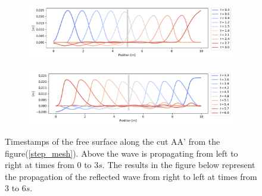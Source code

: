 \documentclass[a4paper,12pt]{article}
\begin{document}
\begin{figure}[h]
\begin{subfigure}{\textwidth}
    \includegraphics[width=\textwidth]{img/step/free_surface_1.pdf}
\end{subfigure}
\begin{subfigure}{\textwidth}
    \includegraphics[width=\textwidth]{img/step/free_surface_2.pdf}
\end{subfigure}
\caption{Timestamps of the free surface along the cut AA' from the figure(\ref{step_mesh}). Above the wave is propagating from left to right at times from $0$ to $3s$. The results in the figure below represent the propagation of the reflected wave from right to left at times from $3$ to $6s$.}
\label{waves_propagation}
\end{figure}
\end{document}
